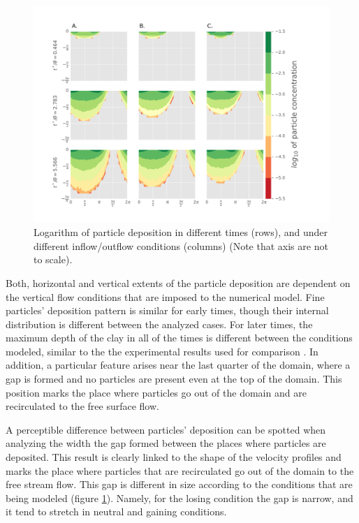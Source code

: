\documentclass[draft,linenumbers]{agujournal2018}
\begin{document}
\begin{figure}
\centering
\includegraphics[trim=0.2cm 0.2cm 0.2cm 0.2cm, width=60pc]
{190131_Logplot.pdf}
\caption{Logarithm of particle deposition in different times (rows), and under different inflow/outflow conditions (columns) (Note that axis are not to scale).}
\label{Logmap}
\end{figure}

Both, horizontal and vertical extents of the particle deposition are dependent on the vertical flow conditions that are imposed to the numerical model. Fine particles' deposition pattern is similar for early times, though their internal distribution is different between the analyzed cases. For later times, the maximum depth of the clay in all of the times is different between the conditions modeled, similar to the the experimental results used for comparison \citep{Fox2018}. In addition, a particular feature arises near the last quarter of the domain, where a gap is formed and no particles are present even at the top of the domain. This position marks the place where particles go out of the domain and are recirculated to the free surface flow. 

A perceptible difference between particles' deposition can be spotted when analyzing the width the gap formed between the places where particles are deposited. This result is clearly linked to the shape of the velocity profiles and marks the place where particles that are recirculated go out of the domain to the free stream flow. This gap is different in size according to the conditions that are being modeled (figure \ref{Logmap}). Namely, for the losing condition the gap is narrow, and it tend to stretch in neutral and gaining conditions. 
\end{document}
